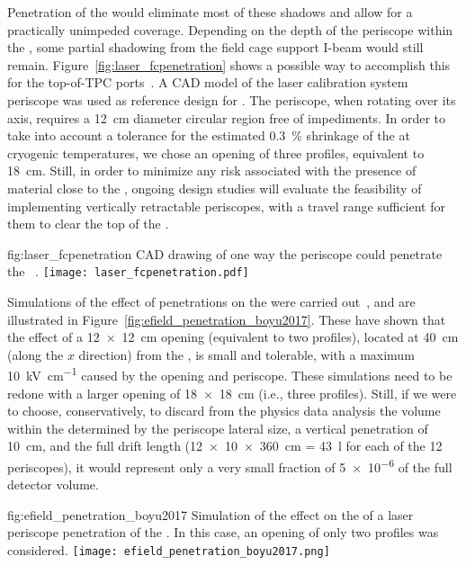 Penetration of the  would eliminate most of these shadows and allow for a practically unimpeded coverage. Depending on the depth of the periscope within the , some partial shadowing from the field cage support I-beam would still remain.
Figure~\ref{fig:laser_fcpenetration} shows a possible way to accomplish this for the top-of-TPC ports~\cite{bib:yu2019a}. A CAD model of the  laser calibration system periscope was used as 
reference design for . The  periscope, when rotating over its axis, requires a \SI{12}{\cm} diameter circular region free of impediments. In order to take into account a tolerance for the estimated \SI{0.3}{\%} shrinkage of the  at cryogenic temperatures, we chose an opening of three profiles, equivalent to \SI{18}{\cm}. 
Still, in order to minimize any risk associated with the presence of material close to the , ongoing design studies will evaluate the feasibility of implementing vertically retractable periscopes, with a travel range sufficient for them to clear the top of the . 

\begin{dunefigure}{fig:laser_fcpenetration}
{CAD drawing of one way the periscope could penetrate the ~\cite{bib:yu2019a}.}
\texttt{[image: laser\_fcpenetration.pdf]}
\end{dunefigure}

Simulations of the effect of  penetrations on the \efield were carried out~\cite{bib:yu2017b}, and are illustrated in Figure~\ref{fig:efield_penetration_boyu2017}. These have shown that the effect of a \SI{12x12}{\cm} opening (equivalent to two profiles), located at \SI{40}{\cm} (along the $x$ direction) from the , is small and tolerable, with a maximum \SI{10}{\kilo\volt\per\cm} \efield caused by the opening and periscope.
These simulations need to be redone with a larger opening of \SI{18x18}{\cm}  (i.e., three profiles).
Still, if we were to choose, conservatively, to discard from the physics data analysis the volume within the  determined by the periscope lateral size, a vertical penetration of \SI{10}{\cm}, and the full drift length (\SI{12x10x360}{\cm} = \SI{43}{\litre} for each of the \num{12} periscopes), it would represent only a very small fraction of \num{5e-6} of the full detector volume.

\begin{dunefigure}{fig:efield_penetration_boyu2017}
{Simulation of the effect on the \efield of a laser periscope penetration of the . In this case, an opening of only two profiles was considered.}
\texttt{[image: efield\_penetration\_boyu2017.png]}
\end{dunefigure}


